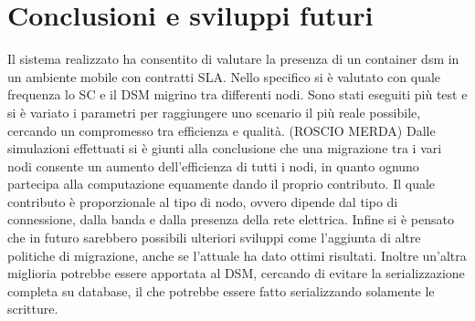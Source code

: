 \chapter{Conclusioni e sviluppi futuri}\label{conclusioni}
Il sistema realizzato ha consentito di valutare la presenza di un container dsm in un ambiente mobile con contratti SLA. Nello specifico si è valutato con quale frequenza lo SC e il DSM migrino tra differenti nodi. Sono stati eseguiti più test e si è variato i parametri per raggiungere uno scenario il più reale possibile, cercando un compromesso tra efficienza e qualità. (ROSCIO MERDA) Dalle simulazioni effettuati si è giunti alla conclusione che una migrazione tra i vari nodi consente un aumento dell'efficienza di tutti i nodi, in quanto ognuno partecipa alla computazione equamente dando il proprio contributo. Il quale contributo è proporzionale al tipo di nodo, ovvero dipende dal tipo di connessione, dalla banda e dalla presenza della rete elettrica. Infine si è pensato che in futuro sarebbero possibili ulteriori sviluppi come l'aggiunta di altre politiche di migrazione, anche se l'attuale ha dato ottimi risultati. Inoltre un'altra miglioria potrebbe essere apportata al DSM, cercando di evitare la serializzazione completa su database, il che potrebbe essere fatto serializzando solamente le scritture.